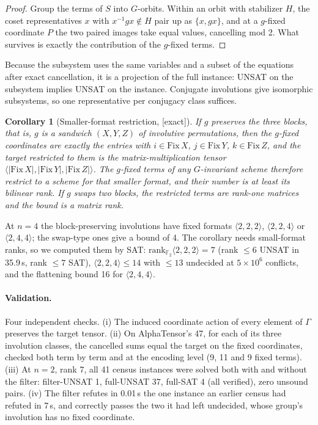 \documentclass[11pt]{article}
\newtheorem{corollary}{Corollary}
\newcommand{\FF}{\mathbb{F}_2}
\newcommand{\tw}[3]{\langle #1,#2,#3\rangle}
\begin{document}
\begin{proof}
Group the terms of $S$ into $G$-orbits. Within an orbit with stabilizer $H$, the coset representatives
$x$ with $x^{-1}gx\notin H$ pair up as $\{x, gx\}$, and at a $g$-fixed coordinate $P$ the two paired
images take equal values, cancelling mod 2. What survives is exactly the contribution of the $g$-fixed
terms.
\end{proof}

Because the subsystem uses the same variables and a subset of the equations after exact cancellation, it
is a projection of the full instance: UNSAT on the subsystem implies UNSAT on the instance. Conjugate
involutions give isomorphic subsystems, so one representative per conjugacy class suffices.

\begin{corollary}[Smaller-format restriction, {[exact]}]
If $g$ preserves the three blocks, that is, $g$ is a sandwich $(X,Y,Z)$ of involutive permutations, then
the $g$-fixed coordinates are exactly the entries with $i\in\mathrm{Fix}\,X$, $j\in\mathrm{Fix}\,Y$,
$k\in\mathrm{Fix}\,Z$, and the target restricted to them is the matrix-multiplication tensor
$\tw{|\mathrm{Fix}\,X|}{|\mathrm{Fix}\,Y|}{|\mathrm{Fix}\,Z|}$. The $g$-fixed terms of any $G$-invariant
scheme therefore restrict to a scheme for that smaller format, and their number is at least its bilinear
rank. If $g$ swaps two blocks, the restricted terms are rank-one matrices and the bound is a matrix rank.
\end{corollary}

At $n=4$ the block-preserving involutions have fixed formats $\tw222$, $\tw224$ or $\tw244$; the
swap-type ones give a bound of 4. The corollary needs small-format ranks, so we computed them by SAT:
$\mathrm{rank}_{\FF}\tw222 = 7$ (rank $\leq6$ UNSAT in 35.9\,s, rank $\leq7$ SAT), $\tw224 \leq 14$ with
$\leq13$ undecided at $5\times10^6$ conflicts, and the flattening bound 16 for $\tw244$.

\paragraph{Validation.} Four independent checks. (i) The induced coordinate action of every element of
$\Gamma$ preserves the target tensor. (ii) On AlphaTensor's 47, for each of its three involution classes,
the cancelled sums equal the target on the fixed coordinates, checked both term by term and at the
encoding level (9, 11 and 9 fixed terms). (iii) At $n=2$, rank 7, all 41 census instances were solved
both with and without the filter: filter-UNSAT 1, full-UNSAT 37, full-SAT 4 (all verified), zero unsound
pairs. (iv) The filter refutes in 0.01\,s the one instance an earlier census had refuted in 7\,s, and
correctly passes the two it had left undecided, whose group's involution has no fixed coordinate.
\end{document}
